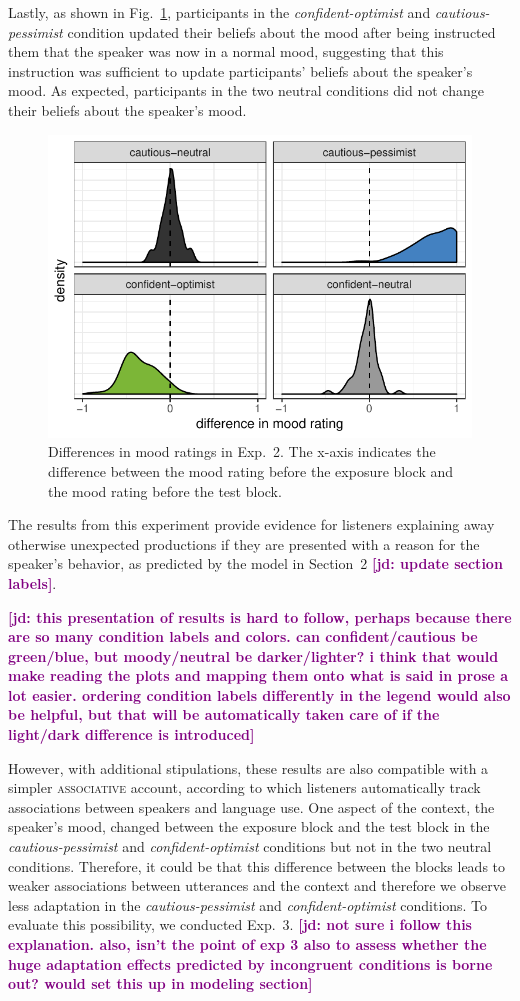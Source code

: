 \documentclass[man,floatsintext]{apa6}
\newcommand{\jd}[1]{\textcolor{Purple}{\bf [jd: #1]}}
\begin{document}
Lastly, as shown in Fig.~\ref{fig:manip-check-exp2}, participants in the \textit{confident-optimist} and \textit{cautious-pessimist} condition updated their beliefs about the mood after being instructed them that the speaker was now in a normal mood, suggesting that this instruction was sufficient to update participants' beliefs about the speaker's mood. As expected, participants in the two neutral conditions did not change their beliefs about the speaker's mood. 

\begin{figure}[t]
\center
    \includegraphics[width=.5\columnwidth]{mood-differences-exp2.pdf}
    \caption{Differences in mood ratings in Exp.~2. The x-axis indicates the difference between the mood rating before the exposure block and the mood rating before the test block.}
    \label{fig:manip-check-exp2}
\end{figure}


The results from this experiment provide evidence for listeners explaining away otherwise unexpected productions if they are presented with a reason for the speaker's behavior, as predicted by the model in Section~2 \jd{update section labels}. 

\jd{this presentation of results is hard to follow, perhaps because there are so many condition labels and colors. can confident/cautious be green/blue, but moody/neutral be darker/lighter? i think that would make reading the plots and mapping them onto what is said in prose a lot easier. ordering condition labels differently in the legend would also be helpful, but that will be automatically taken care of if the light/dark difference is introduced}

However, with additional stipulations, these results are also compatible with a simpler \textsc{associative} account, according to which listeners automatically track associations between speakers and language use. One aspect of the context, the speaker's mood, changed between the exposure block and the test block in the \textit{cautious-pessimist} and \textit{confident-optimist} conditions but not in the two neutral conditions. Therefore, it could be that this difference between the blocks leads to weaker associations between utterances and the context and therefore we observe less adaptation in the \textit{cautious-pessimist} and \textit{confident-optimist} conditions. To evaluate this possibility, we conducted Exp.~3. \jd{not sure i follow this explanation. also, isn't the point of exp 3 also to assess whether the huge adaptation effects predicted by incongruent conditions is borne out? would set this up in modeling section}
\end{document}
